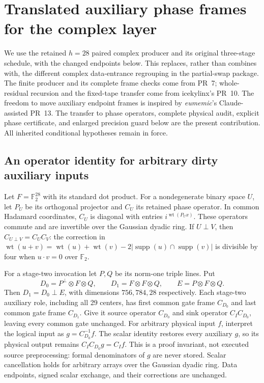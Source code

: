 \section{Translated auxiliary phase frames for the complex layer}
\label{sec:translated-partial-complex}
We use the retained $h=28$ paired complex producer and its original
three-stage schedule, with the changed endpoints below. This replaces,
rather than combines with, the different complex data-entrance regrouping
in the partial-swap package. The finite producer and its complete frame
checks come from PR~7; whole-residual recursion and the fixed-tape transfer
come from icekylinx's PR~10. The freedom to move auxiliary endpoint frames
is inspired by \emph{eumemic}'s Claude-assisted PR~13. The transfer to
phase operators, complete physical audit, explicit phase certificate, and
enlarged precision guard below are the present contribution. All inherited
conditional hypotheses remain in force.

\subsection{An operator identity for arbitrary dirty auxiliary inputs}
\label{sec:translated-complex-source}
Let $F=\mathbb F_2^{28}$ with its standard dot product. For a nondegenerate
binary space $U$, let $P_U$ be its orthogonal projector and $C_U$ its
retained phase operator. In common Hadamard coordinates, $C_U$ is diagonal
with entries $i^{\operatorname{wt}(P_Ux)}$. These operators commute and
are invertible over the Gaussian dyadic ring. If $U\perp V$, then
$C_{U\mathbin\perp V}=C_UC_V$: the correction in
$\operatorname{wt}(u+v)=\operatorname{wt}(u)+\operatorname{wt}(v)
-2|\operatorname{supp}(u)\cap\operatorname{supp}(v)|$ is divisible by
four when $u\cdot v=0$ over $\mathbb F_2$.

For a stage-two invocation let $P,Q$ be its norm-one triple lines. Put
\[
 D_0=P^\perp\otimes F\otimes Q,\qquad D_1=F\otimes F\otimes Q,
 \qquad E=P\otimes F\otimes Q.
\]
Then $D_1=D_0\mathbin\perp E$, with dimensions $756,784,28$ respectively.
Each stage-two auxiliary role, including all 29 centers, has first common
gate frame $C_{D_0}$ and last common gate frame $C_{D_1}$.
Give it source operator $C_{D_0}$ and sink operator $C_I C_{D_0}$,
leaving every common gate unchanged. For arbitrary physical input $f$,
interpret the logical input as $g=C_{D_0}^{-1}f$. The scalar identity
restores every auxiliary $g$, so its physical output remains
$C_I C_{D_0}g=C_If$. This is a proof invariant, not executed source
preprocessing: formal denominators of $g$ are never stored. Scalar
cancellation holds for arbitrary arrays over the Gaussian dyadic ring.
Data endpoints, signed scalar exchange, and their corrections are unchanged.

